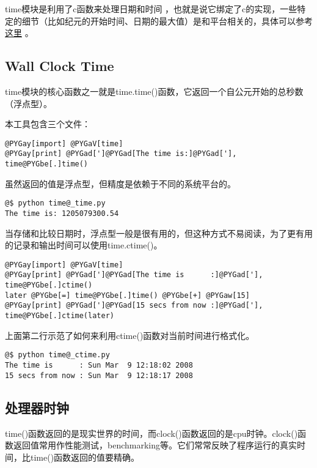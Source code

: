 \documentclass[a4paper,10pt,english]{manual}
\begin{document}
time模块是利用了c函数来处理日期和时间 ，也就是说它绑定了c的实现，一些特定的细节（比如纪元的开始时间、日期的最大值）是和平台相关的，具体可以参考 \href{http://docs.python.org/lib/module-time.html}{这里} 。


\subsection{Wall Clock Time}

time模块的核心函数之一就是time.time()函数，它返回一个自公元开始的总秒数（浮点型）。

本工具包含三个文件：

\begin{Verbatim}[commandchars=@\[\]]
@PYGay[import] @PYGaV[time]
@PYGay[print] @PYGad[']@PYGad[The time is:]@PYGad['], time@PYGbe[.]time()
\end{Verbatim}

虽然返回的值是浮点型，但精度是依赖于不同的系统平台的。

\begin{Verbatim}[commandchars=@\[\]]
@$ python time@_time.py
The time is: 1205079300.54
\end{Verbatim}

当存储和比较日期时，浮点型一般是很有用的，但这种方式不易阅读，为了更有用的记录和输出时间可以使用time.ctime()。

\begin{Verbatim}[commandchars=@\[\]]
@PYGay[import] @PYGaV[time]
@PYGay[print] @PYGad[']@PYGad[The time is      :]@PYGad['], time@PYGbe[.]ctime()
later @PYGbe[=] time@PYGbe[.]time() @PYGbe[+] @PYGaw[15]
@PYGay[print] @PYGad[']@PYGad[15 secs from now :]@PYGad['], time@PYGbe[.]ctime(later)
\end{Verbatim}

上面第二行示范了如何来利用ctime()函数对当前时间进行格式化。

\begin{Verbatim}[commandchars=@\[\]]
@$ python time@_ctime.py
The time is      : Sun Mar  9 12:18:02 2008
15 secs from now : Sun Mar  9 12:18:17 2008
\end{Verbatim}


\subsection{处理器时钟}

time()函数返回的是现实世界的时间，而clock()函数返回的是cpu时钟。clock()函数返回值常用作性能测试，benchmarking等。它们常常反映了程序运行的真实时间，比time()函数返回的值要精确。
\end{document}

